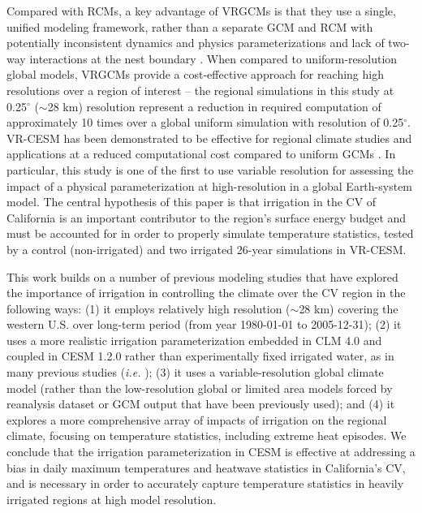 \documentclass[draft,ms]{agutex}   %
\begin{document}
\begin{article}
Compared with RCMs, a key advantage of VRGCMs is that they use a single, unified modeling framework, rather than a separate GCM and RCM with potentially inconsistent dynamics and physics parameterizations and lack of two-way interactions at the nest boundary \citep{laprise2008challenging}. When compared to uniform-resolution global models, VRGCMs provide a cost-effective approach for reaching high resolutions over a region of interest -- the regional simulations in this study at 0.25$^\circ$ ($\sim$28 km) resolution represent a reduction in required computation of approximately 10 times over a global uniform simulation with resolution of 0.25$^\circ$. VR-CESM has been demonstrated to be effective for regional climate studies and applications at a reduced computational cost compared to uniform GCMs \citep{zarzycki2015effects, rhoades2015characterizing, huang2016evaluation}. In particular, this study is one of the first to use variable resolution for assessing the impact of a physical parameterization at high-resolution in a global Earth-system model. The central hypothesis of this paper is that irrigation in the CV of California is an important contributor to the region's surface energy budget and must be accounted for in order to properly simulate temperature statistics, tested by a control (non-irrigated) and two irrigated 26-year simulations in VR-CESM.

This work builds on a number of previous modeling studies that have explored the importance of irrigation in controlling the climate over the CV region in the following ways: (1) it employs relatively high resolution ($\sim$28 km) covering the western U.S. over long-term period  (from year 1980-01-01 to 2005-12-31); (2) it uses a more realistic irrigation parameterization embedded in CLM 4.0 and coupled in CESM 1.2.0 rather than experimentally fixed irrigated water, as in many previous studies (\textit{i.e.} \cite{lobell2006biogeophysical, lo2013irrigation}); (3) it uses a variable-resolution global climate model (rather than the low-resolution global or limited area models forced by reanalysis dataset or GCM output that have been previously used); and (4) it explores a more comprehensive array of impacts of irrigation on the regional climate, focusing on temperature statistics, including extreme heat episodes.  We conclude that the irrigation parameterization in CESM is effective at addressing a bias in daily maximum temperatures and heatwave statistics in California's CV, and is necessary in order to accurately capture temperature statistics in heavily irrigated regions at high model resolution.


\end{article}
\end{document}
